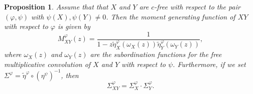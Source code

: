 \documentclass[12pt]{amsart}
\newtheorem{proposition}[theorem]{Proposition}
\theoremstyle{definition}
\numberwithin{equation}{section}
\begin{document}

\begin{proposition}
  Assume that that $X$ and $Y$ are $c$-free with respect to the pair
 $(\varphi,\psi)$
  with   $\psi(X),\psi(Y)\ne0$.
  Then the moment generating function of $XY$ with respect to $\varphi$ is given by
  \begin{equation}
    M_{XY}^\varphi(z) = \frac{1}{
      1- z\tilde{\eta}^\varphi_X(\omega_X(z))\tilde{\eta}^\varphi_Y(\omega_Y(z))
    },
    \label{eq:XY:MphiXY}
  \end{equation}
  where $\omega_X(z)$ and $\omega_Y(z)$ are the subordination functions for the free multiplicative convolution of $X$ and $Y$ with respect to $\psi$. Furthermore, if we set $\Sigma^\varphi = \tilde\eta^\varphi\circ(\eta^\psi)^{-1}$, then
  \begin{equation}
    \label{eq:PopaWang}
    \Sigma^\varphi_{XY} = \Sigma^\varphi_X\cdot \Sigma^\varphi_Y.
  \end{equation}
\end{proposition}
\end{document}
